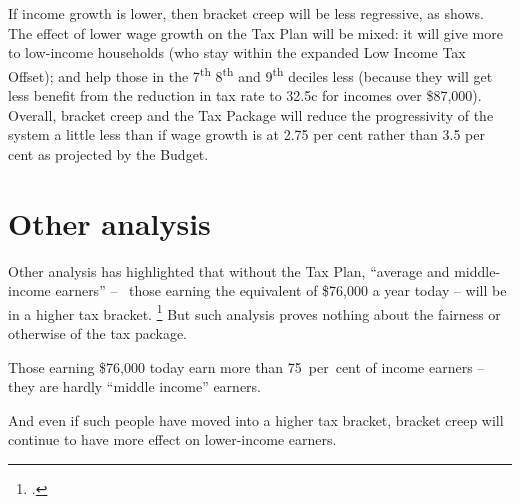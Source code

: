 \documentclass[submission]{grattan}\usepackage[]{graphicx}\usepackage[]{color}
\begin{document}
If income growth is lower, then bracket creep will be less regressive, as  shows. The effect of lower wage growth on the Tax Plan will be mixed: it will give more to low-income households (who stay within the expanded Low Income Tax Offset); and help those in the 7\textsuperscript{th} 8\textsuperscript{th} and 9\textsuperscript{th} deciles less (because they will get less benefit from the reduction in tax rate to 32.5c for incomes over \$87,000). Overall, bracket creep and the Tax Package will reduce the progressivity of the system a little less than if wage growth is at 2.75 per cent rather than 3.5 per cent as projected by the Budget.

\section{Other analysis}\label{sec:other-analysis}

Other analysis has highlighted that without the Tax Plan, ``average and middle-income earners'' -- \ie~those earning the equivalent of \$76,000 a year today -- will be in a higher tax bracket.
  \footcite{Benson}
But such analysis proves nothing about the fairness or otherwise of the tax package.

Those earning \$76,000 today earn more than 75~per~cent of income earners -- they are hardly ``middle income'' earners.

And even if such people have moved into a higher tax bracket, bracket creep will continue to have more effect on lower-income earners.

\vspace{3\baselineskip}
\end{document}
